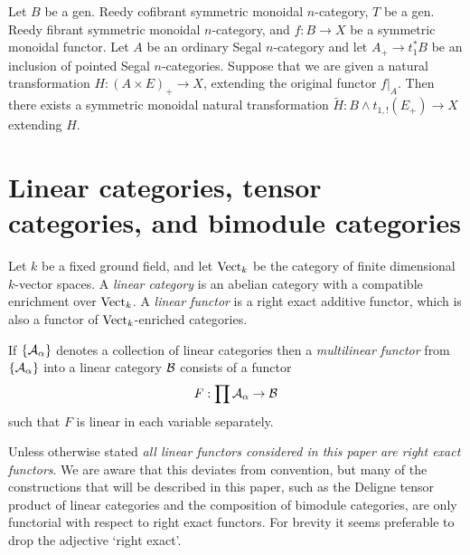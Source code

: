 \documentclass[a4paper]{amsart}
\begin{document}
\begin{theorem}
	Let $B$ be a gen. Reedy cofibrant symmetric monoidal $n$-category, $T$ be a gen. Reedy fibrant symmetric monoidal $n$-category, and $f: B \to X$ be a symmetric monoidal functor. Let $A$ be an ordinary Segal $n$-category and let $A_+ \to t^*_1 B$ be an inclusion of pointed Segal $n$-categories. Suppose that we are given a natural transformation $H: (A \times E)_+ \to X$, extending the original functor $f|_A$. Then there exists a symmetric monoidal natural transformation $\tilde{H}: B \wedge t_{1,!}(E_+) \to X$ extending $H$.  
\end{theorem}



\section{Linear categories, tensor categories, and bimodule categories} \label{sec-tc-lincat}



	Let $k$ be a fixed ground field, and let $\mathrm{Vect}_k$ be the category of finite dimensional $k$-vector spaces.   A {\em linear category} is an abelian category with a compatible enrichment over ${\mathrm{Vect}}_k$.  A {\em linear functor} is a right exact additive functor, which is also a functor of ${\mathrm{Vect}}_k$-enriched categories. 
	
If $\{\mathcal A_\alpha\}$ denotes a collection of linear categories then a {\em multilinear functor} from $\{\mathcal A_\alpha\}$ into a linear category $\mathcal B$ consists of a functor
\begin{equation*}
	F: \prod \mathcal A_\alpha \to \mathcal B
\end{equation*}
such that $F$ is linear in each variable separately. 

\begin{warning}
	Unless otherwise stated {\em all linear functors considered in this paper are right exact functors}.  We are aware that this deviates from convention, but many of the constructions that will be described in this paper, such as the Deligne tensor product of linear categories and the composition of bimodule categories, are only functorial with respect to right exact functors. For brevity it seems preferable to drop the adjective `right exact'. 
\end{warning} 
\end{document}
